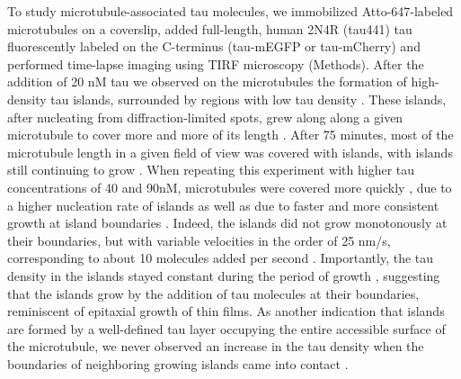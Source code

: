 To study microtubule-associated tau molecules, we immobilized Atto-647-labeled microtubules on a coverslip, added full-length, human 2N4R (tau441) tau fluorescently labeled on the C-terminus (tau-mEGFP or tau-mCherry) and performed time-lapse imaging using TIRF microscopy (Methods). After the addition of 20 nM tau we observed on the microtubules the formation of high-density tau islands, surrounded by regions with low tau density . These islands, after nucleating from diffraction-limited spots, grew along along a given microtubule to cover more and more of its length . After 75 minutes, most of the microtubule length in a given field of view was covered with islands, with islands still continuing to grow . When repeating this experiment with higher tau concentrations of 40 and 90nM, microtubules were covered more quickly , due to a higher nucleation rate of islands  as well as due to faster and more consistent growth at island boundaries . Indeed, the islands did not grow monotonously at their boundaries, but with variable velocities in the order of 25 nm/s, corresponding to about 10 molecules added per second . Importantly, the tau density in the islands stayed constant during the period of growth , suggesting that the islands grow by the addition of tau molecules at their boundaries, reminiscent of epitaxial growth of thin films. As another indication that islands are formed by a well-defined tau layer occupying the entire accessible surface of the microtubule, we never observed an increase in the tau density when the boundaries of neighboring growing islands came into contact .\par

